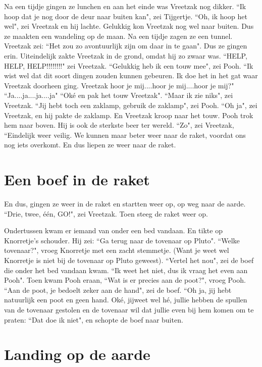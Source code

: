 \documentclass{article}
\begin{document}
Na een tijdje gingen ze lunchen en aan het einde was Vreetzak nog dikker. ``Ik hoop dat je nog door de deur naar buiten kan", zei Tijgertje. ``Oh, ik hoop het wel", zei Vreetzak en hij lachte. Gelukkig kon Vreetzak nog wel naar buiten. Dus ze maakten een wandeling op de maan. Na een tijdje zagen ze een tunnel. Vreetzak zei: ``Het zou zo avontuurlijk zijn om daar in te gaan". Dus ze gingen erin. Uiteindelijk zakte Vreetzak in de grond, omdat hij zo zwaar was. ``HELP, HELP, HELP!!!!!!!!" zei Vreetzak. ``Gelukkig heb ik een touw mee", zei Pooh. ``Ik wist wel dat dit soort dingen zouden kunnen gebeuren. Ik doe het in het gat waar Vreetzak doorheen ging. Vreetzak hoor je mij....hoor je mij....hoor je mij?" ``Ja....ja....ja....ja" ``Oké en pak het touw Vreetzak". ``Maar ik zie niks", zei Vreetzak. ``Jij hebt toch een zaklamp, gebruik de zaklamp", zei Pooh. ``Oh ja", zei Vreetzak, en hij pakte de zaklamp. En Vreetzak kroop naar het touw. Pooh trok hem naar boven. Hij is ook de sterkste beer ter wereld. ``Zo", zei Vreetzak, ``Eindelijk weer veilig. We kunnen maar beter weer naar de raket, voordat ons nog iets overkomt. En dus liepen ze weer naar de raket.

\section{Een boef in de raket}

En dus, gingen ze weer in de raket en startten weer op, op weg naar de aarde. ``Drie, twee, één, GO!", zei Vreetzak. Toen steeg de raket weer op.

Ondertussen kwam er iemand van onder een bed vandaan. En tikte op Knorretje's schouder. Hij zei: ``Ga terug naar de tovenaar op Pluto". ``Welke tovenaar?", vroeg Knorretje met een zacht stemmetje. (Want je weet wel Knorretje is niet bij de tovenaar op Pluto geweest). ``Vertel het nou", zei de boef die onder het bed vandaan kwam. ``Ik weet het niet, dus ik vraag het even aan Pooh". Toen kwam Pooh eraan, ``Wat is er precies aan de poot?", vroeg Pooh. ``Aan de poot, je bedoelt zeker aan de hand", zei de boef. ``Oh ja, jij hebt natuurlijk een poot en geen hand. Oké, jijweet wel hé, jullie hebben de spullen van de tovenaar gestolen en de tovenaar wil dat jullie even bij hem komen om te praten: ``Dat doe ik niet", en schopte de boef naar buiten.

\section{Landing op de aarde}
\end{document}
